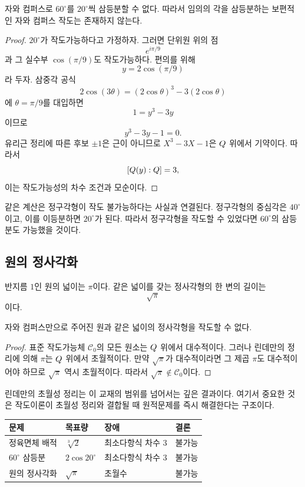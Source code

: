 \begin{theorem}
자와 컴퍼스로 $60^\circ$를 $20^\circ$씩 삼등분할 수 없다. 따라서 임의의 각을 삼등분하는 보편적인 자와 컴퍼스 작도는 존재하지 않는다.
\end{theorem}

\begin{proof}
$20^\circ$가 작도가능하다고 가정하자. 그러면 단위원 위의 점
\[
  e^{i\pi/9}
\]
과 그 실수부 $\cos(\pi/9)$도 작도가능하다. 편의를 위해
\[
  y=2\cos(\pi/9)
\]
라 두자. 삼중각 공식
\[
  2\cos(3\theta)=(2\cos\theta)^3-3(2\cos\theta)
\]
에 $\theta=\pi/9$를 대입하면
\[
  1=y^3-3y
\]
이므로
\[
  y^3-3y-1=0.
\]
유리근 정리에 따른 후보 $\pm1$은 근이 아니므로 $X^3-3X-1$은 $Q$ 위에서 기약이다. 따라서
\[
  [Q(y):Q]=3,
\]
이는 작도가능성의 차수 조건과 모순이다.
\end{proof}

\begin{remark}
같은 계산은 정구각형이 작도 불가능하다는 사실과 연결된다. 정구각형의 중심각은 $40^\circ$이고, 이를 이등분하면 $20^\circ$가 된다. 따라서 정구각형을 작도할 수 있었다면 $60^\circ$의 삼등분도 가능했을 것이다.
\end{remark}

\subsection{원의 정사각화}

반지름 $1$인 원의 넓이는 $\pi$이다. 같은 넓이를 갖는 정사각형의 한 변의 길이는
\[
  \sqrt\pi
\]
이다.

\begin{theorem}
자와 컴퍼스만으로 주어진 원과 같은 넓이의 정사각형을 작도할 수 없다.
\end{theorem}

\begin{proof}
표준 작도가능체 $\mathcal C_0$의 모든 원소는 $Q$ 위에서 대수적이다. 그러나 린데만의 정리에 의해 $\pi$는 $Q$ 위에서 초월적이다. 만약 $\sqrt\pi$가 대수적이라면 그 제곱 $\pi$도 대수적이어야 하므로 $\sqrt\pi$ 역시 초월적이다. 따라서 $\sqrt\pi\notin\mathcal C_0$이다.
\end{proof}

린데만의 초월성 정리는 이 교재의 범위를 넘어서는 깊은 결과이다. 여기서 중요한 것은 작도이론이 초월성 정리와 결합될 때 원적문제를 즉시 해결한다는 구조이다.

\begin{center}
\renewcommand{\arraystretch}{1.25}
\begin{tabular}{llll}
\toprule
문제 & 목표량 & 장애 & 결론 \\
\midrule
정육면체 배적 & $\sqrt[3]2$ & 최소다항식 차수 $3$ & 불가능 \\
$60^\circ$ 삼등분 & $2\cos20^\circ$ & 최소다항식 차수 $3$ & 불가능 \\
원의 정사각화 & $\sqrt\pi$ & 초월수 & 불가능 \\
\bottomrule
\end{tabular}
\end{center}

